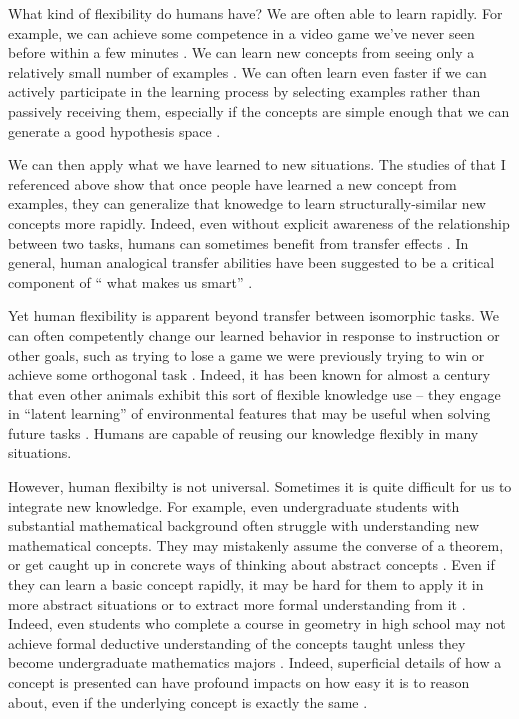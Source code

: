 \documentclass[11pt]{article}
\begin{document}
What kind of flexibility do humans have? We are often able to learn rapidly. For example, we can achieve some competence in a video game we've never seen before within a few minutes \citep{Lake2016}. We can learn new concepts from seeing only a relatively small number of examples \citep[e.g.]{Bourne1970}. We can often learn even faster if we can actively participate in the learning process by selecting examples rather than passively receiving them, especially if the concepts are simple enough that we can generate a good hypothesis space \citep{Markant2014a}. \par
We can then apply what we have learned to new situations. The studies of \citet{Bourne1970} that I referenced above show that once people have learned a new concept from examples, they can generalize that knowedge to learn structurally-similar new concepts more rapidly. Indeed, even without explicit awareness of the relationship between two tasks, humans can sometimes benefit from transfer effects \citep[e.g.]{Day2011}. In general, human analogical transfer abilities have been suggested to be a critical component of `` what makes us smart'' \citep{Gentner2003}. \par
Yet human flexibility is apparent beyond transfer between isomorphic tasks. We can often competently change our learned behavior in response to instruction or other goals, such as trying to lose a game we were previously trying to win or achieve some orthogonal task \citep{Lake2016}. Indeed, it has been known for almost a century that even other animals exhibit this sort of flexible knowledge use -- they engage in ``latent learning'' of environmental features that may be useful when solving future tasks \citep{Blodgett1929}. Humans are capable of reusing our knowledge flexibly in many situations. \par
However, human flexibilty is not universal. Sometimes it is quite difficult for us to integrate new knowledge. For example, even undergraduate students with substantial mathematical background often struggle with understanding new mathematical concepts. They may mistakenly assume the converse of a theorem, or get caught up in concrete ways of thinking about abstract concepts \citep{Hazzan1999}. Even if they can learn a basic concept rapidly, it may be hard for them to apply it in more abstract situations or to extract more formal understanding from it \citep[e.g.]{Lampinen2017b}. Indeed, even students who complete a course in geometry in high school may not achieve formal deductive understanding of the concepts taught unless they become undergraduate mathematics majors \citep{Burger1986}. Indeed, superficial details of how a concept is presented can have profound impacts on how easy it is to reason about, even if the underlying concept is exactly the same \citep[e.g.]{Kotovsky1985}. \par 
\end{document}
